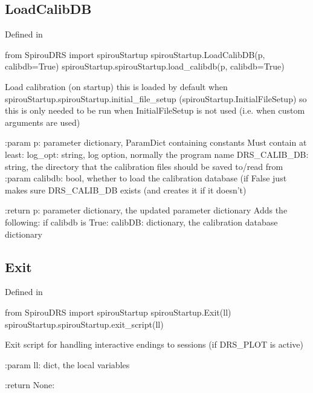 \noindent\begin{minipage}{\textwidth}
\subsection{LoadCalibDB}

Defined in \spirouStartup{}

\begin{pythonbox}
from SpirouDRS import spirouStartup
spirouStartup.LoadCalibDB(p, calibdb=True)
spirouStartup.spirouStartup.load_calibdb(p, calibdb=True)
\end{pythonbox}

\begin{pythondocstring}
Load calibration (on startup) this is loaded by default when
spirouStartup.spirouStartup.initial_file_setup
(spirouStartup.InitialFileSetup) so this is only needed to be run when
InitialFileSetup is not used (i.e. when custom arguments are used)


:param p: parameter dictionary, ParamDict containing constants
    Must contain at least:
            log_opt: string, log option, normally the program name
            DRS_CALIB_DB: string, the directory that the calibration
                          files should be saved to/read from
:param calibdb: bool, whether to load the calibration database (if False
                just makes sure DRS_CALIB_DB exists (and creates it if it
                doesn't)

:return p: parameter dictionary, the updated parameter dictionary
        Adds the following:
            if calibdb is True:
                calibDB: dictionary, the calibration database dictionary
\end{pythondocstring}
\end{minipage}




\noindent\begin{minipage}{\textwidth}
\subsection{Exit}

Defined in \spirouStartup{}

\begin{pythonbox}
from SpirouDRS import spirouStartup
spirouStartup.Exit(ll)
spirouStartup.spirouStartup.exit_script(ll)
\end{pythonbox}

\begin{pythondocstring}
Exit script for handling interactive endings to sessions (if DRS_PLOT is
active)

:param ll: dict, the local variables

:return None:
\end{pythondocstring}
\end{minipage}